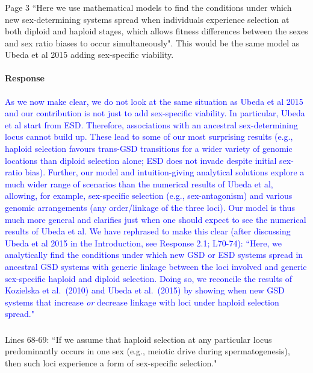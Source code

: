 \documentclass[10pt,letterpaper]{article}
\begin{document}
\noindent\subsubsection{}
Page 3 ``Here we use mathematical models to find the conditions under which new sex-determining systems spread when individuals experience selection at both diploid and haploid stages, which allows fitness differences between the sexes and sex ratio biases to occur simultaneously".
This would be the same model as Ubeda et al 2015 adding sex-specific viability.

\noindent\paragraph{Response}
\textcolor{blue}{
As we now make clear, we do not look at the same situation as Ubeda et al 2015 and our contribution is not just to add sex-specific viability. 
In particular, Ubeda et al start from ESD. 
Therefore, associations with an ancestral sex-determining locus cannot build up. 
These lead to some of our most surprising results (e.g., haploid selection favours trans-GSD transitions for a wider variety of genomic locations than diploid selection alone; ESD does not invade despite initial sex-ratio bias).
Further, our model and intuition-giving analytical solutions explore a much wider range of scenarios than the numerical results of Ubeda et al, allowing, for example, sex-specific selection (e.g., sex-antagonism) and various genomic arrangements (any order/linkage of the three loci).
Our model is thus much more general and clarifies just when one should expect to see the numerical results of Ubeda et al.
We have rephrased to make this clear (after discussing Ubeda et al 2015 in the Introduction, see Response 2.1; L70-74): ``Here, we analytically find the conditions under which new GSD or ESD systems spread in ancestral GSD systems with generic linkage between the loci involved and generic sex-specific haploid and diploid selection. 
Doing so, we reconcile the results of Kozielska et al.\ (2010) and Ubeda et al.\ (2015) by showing when new GSD systems that increase \textit{or} decrease linkage with loci under haploid selection spread."
}

\noindent\subsubsection{}
Lines 68-69: ``If we assume that haploid selection at any particular locus predominantly occurs in one sex (e.g., meiotic drive during spermatogenesis), then such loci experience a form of sex-specific selection." 
\end{document}
